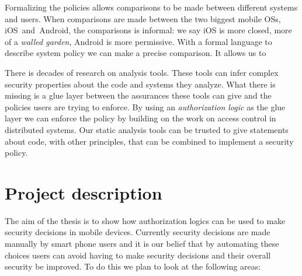 \documentclass[a4paper]{article}
\begin{document}
Formalizing the policies allows comparisons to be made between different systems
and users.  When comparisons are made between the two biggest mobile OSs,
iOS~and~Android, the comparisons is informal: we say iOS is more closed, more of
a \emph{walled garden}, Android is more permissive.  With a formal language to
describe system policy we can make a precise comparison.  It allows us to 

There is decades of research on analysis tools.  These tools can infer complex
security properties about the code and systems they analyze.  What there is
missing is a glue layer between the assurances these tools can give and the
policies users are trying to enforce.  By using an \emph{authorization logic} as
the glue layer we can enforce the policy by building on the work on access
control in distributed systems.  Our static analysis tools can be trusted to
give statements about code, with other principles, that can be combined to
implement a security policy.


\section{Project description}

The aim of the thesis is to show how authorization logics can be used to make
security decisions in mobile devices.  Currently security decisions are made
manually by smart phone users and it is our belief that by automating these
choices users can avoid having to make security decisions and their overall
security be improved.  To do this we plan to look at the following areas: 
\end{document}
